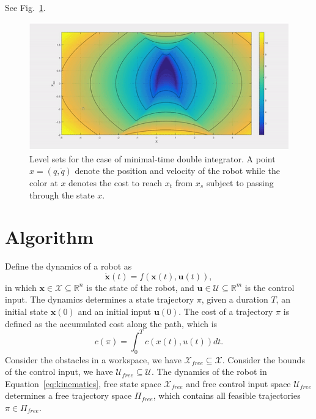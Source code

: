 \documentclass[letterpaper, 10 pt, conference]{ieeeconf}  %
\begin{document}
See Fig.~\ref{fig:informed_1d_di}.
\begin{figure}[tb]
  \centering
  	\includegraphics[height = 4.cm ]{level_set.jpg}
  \caption{
    \captionstyle
  	Level sets for the case of minimal-time double integrator. A point $x = (q, \dot{q})$  denote the position and velocity of the robot while the color at $x$ denotes the cost to reach $x_t$ from $x_s$ subject to passing through the state $x$.
  	}
   	\label{fig:informed_1d_di}
	\vspace{-5.5mm}
\end{figure}


\section{Algorithm}
\label{sec:algorithm}

Define the dynamics of a robot as 
\begin{equation}
\label{eq:kinematics}
\dot{\bm{x}}(t) = f( \bm{x}(t) , \bm{u}(t) ), 
\end{equation}
in which $ \bm{x} \in \mathcal{X} \subseteq \mathbb{R}^n $ is the state of the robot, and $ \bm{u} \in \mathcal{U} \subseteq \mathbb{R}^m $ is the control input.
The dynamics determines a state trajectory $ \pi $, given a duration $ T $, an initial state $ \bm{x}(0) $ and an initial input $ \bm{u}(0) $.
The cost of a trajectory $ \pi $ is defined as the accumulated cost along the path, which is 
\begin{equation}
\label{eq:path_cost}
c(\pi) = \int_0^{T} c( x(t), u(t) ) dt.
\end{equation}
Consider the obstacles in a workspace, we have $ \mathcal{X}_{free} \subseteq \mathcal{X} $.
Consider the bounds of the control input, we have $ \mathcal{U}_{free} \subseteq \mathcal{U} $.
The dynamics of the robot in Equation~\eqref{eq:kinematics}, free state space $  \mathcal{X}_{free} $ and free control input space $ \mathcal{U}_{free} $ determines a free trajectory space $ \Pi_{free} $, which contains all feasible trajectories $ \pi \in \Pi_{free} $.
\end{document}
